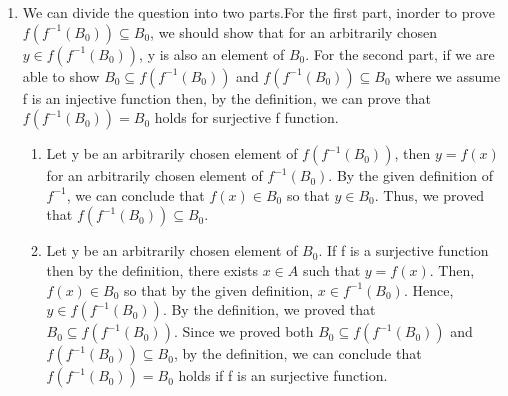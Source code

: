 \documentclass[11pt]{article}
\begin{document}
\begin{enumerate}
	\item
	We can divide the question into two parts.For the first part, inorder to prove $f(f^{-1}(B_{0})) \subseteq B_{0}$, we should show that for an arbitrarily chosen $y \in f(f^{-1}(B_{0}))$, y is also an element of $B_{0}$. For the second part, if we are able to show $B_{0} \subseteq f(f^{-1}(B_{0}))$ and $f(f^{-1}(B_{0})) \subseteq B_{0}$ where we assume f is an injective function then, by the definition, we can prove that $f(f^{-1}(B_{0})) = B_{0}$ holds for surjective f function.
	\renewcommand{\theenumii}{\roman{enumii}}
	\begin{enumerate}
		\item 
		Let y be an arbitrarily chosen element of $f(f^{-1}(B_{0}))$, then $y = f(x)$ for an arbitrarily chosen element of $f^{-1}(B_{0})$. By the given definition of $f^{-1}$, we can conclude that $f(x) \in B_{0}$ so that $y \in B_{0}$. Thus, we proved that $f(f^{-1}(B_{0})) \subseteq B_{0}$.
		
		\item
		Let y be an arbitrarily chosen element of $B_{0}$. If f is a surjective function then by the definition, there exists $x \in A$ such that $y = f(x)$. Then, $f(x)\in B_{0}$ so that by the given definition, $x \in f^{-1}(B_{0})$. Hence, $y \in f(f^{-1}(B_{0}))$. By the definition, we proved that $B_{0} \subseteq f(f^{-1}(B_{0}))$. Since we proved both $B_{0} \subseteq f(f^{-1}(B_{0}))$ and $f(f^{-1}(B_{0})) \subseteq B_{0}$, by the definition, we can conclude that $f(f^{-1}(B_{0})) = B_{0}$ holds if f is an surjective function.
	\end{enumerate}
	
\end{enumerate}
\end{document}
